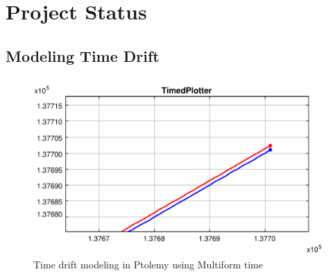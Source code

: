\section{Project Status}
\label{sec:project-status}

\subsection{Modeling Time Drift}
\label{sec:modeling-time-drift}

\begin{figure}
  \centering
  \includegraphics[width=\textwidth]{figures/time-drift.pdf}
  \caption{Time drift modeling in Ptolemy using Multiform time}
  \label{fig:time}
\end{figure}


